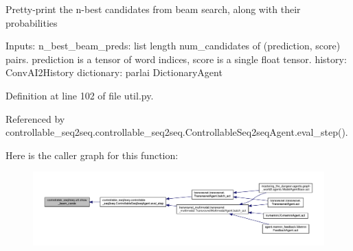 \begin{DoxyVerb}Pretty-print the n-best candidates from beam search, along with their probabilities

Inputs:
  n_best_beam_preds: list length num_candidates of (prediction, score) pairs.
    prediction is a tensor of word indices, score is a single float tensor.
  history: ConvAI2History
  dictionary: parlai DictionaryAgent
\end{DoxyVerb}
 

Definition at line 102 of file util.\+py.



Referenced by controllable\+\_\+seq2seq.\+controllable\+\_\+seq2seq.\+Controllable\+Seq2seq\+Agent.\+eval\+\_\+step().

Here is the caller graph for this function\+:
\nopagebreak
\begin{figure}[H]
\begin{center}
\leavevmode
\includegraphics[width=350pt]{namespacecontrollable__seq2seq_1_1util_a616447119991c41cded3c7a8c3e01acc_icgraph}
\end{center}
\end{figure}
